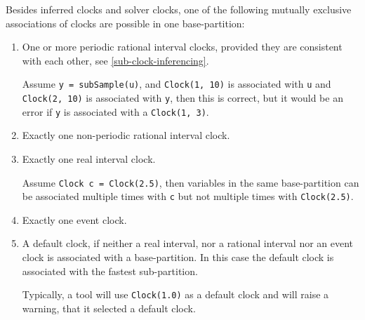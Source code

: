 Besides inferred clocks and solver clocks, one of the following mutually exclusive associations of clocks are possible in one base-partition:
\begin{enumerate}
\item
  One or more periodic rational interval clocks, provided they are consistent with each other, see \cref{sub-clock-inferencing}.
  \begin{example}
  Assume \lstinline!y = subSample(u)!, and \lstinline!Clock(1, 10)! is associated with \lstinline!u! and \lstinline!Clock(2, 10)! is associated with \lstinline!y!, then this is correct, but it would be an error if \lstinline!y! is associated with a \lstinline!Clock(1, 3)!.
  \end{example}
\item
  Exactly one non-periodic rational interval clock.
\item
  Exactly one real interval clock.
  \begin{example}
  Assume \lstinline!Clock c = Clock(2.5)!, then variables in the same base-partition can be associated multiple times with \lstinline!c! but not multiple times with \lstinline!Clock(2.5)!.
  \end{example}
\item
  Exactly one event clock.
\item
  A default clock, if neither a real interval, nor a rational interval nor an event clock is associated with a base-partition.
  In this case the default clock is associated with the fastest sub-partition.
  \begin{nonnormative}
  Typically, a tool will use \lstinline!Clock(1.0)! as a default clock and will raise a warning, that it selected a default clock.
  \end{nonnormative}
\end{enumerate}

